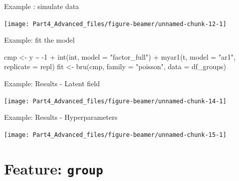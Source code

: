 \documentclass[
  ignorenonframetext,
  handout]{beamer}
\newenvironment{Shaded}{\begin{snugshade}}{\end{snugshade}}
\newcommand{\AttributeTok}[1]{\textcolor[rgb]{0.77,0.63,0.00}{#1}}
\newcommand{\DecValTok}[1]{\textcolor[rgb]{0.00,0.00,0.81}{#1}}
\newcommand{\FunctionTok}[1]{\textcolor[rgb]{0.00,0.00,0.00}{#1}}
\newcommand{\NormalTok}[1]{#1}
\newcommand{\OtherTok}[1]{\textcolor[rgb]{0.56,0.35,0.01}{#1}}
\newcommand{\SpecialCharTok}[1]{\textcolor[rgb]{0.00,0.00,0.00}{#1}}
\newcommand{\StringTok}[1]{\textcolor[rgb]{0.31,0.60,0.02}{#1}}
\begin{document}
\begin{frame}{Example : simulate data}
\protect\hypertarget{example-simulate-data-1}{}
\begin{center}\texttt{[image: Part4\_Advanced\_files/figure-beamer/unnamed-chunk-12-1]} \end{center}
\normalsize
\end{frame}

\begin{frame}[fragile]{Example: fit the model}
\protect\hypertarget{example-fit-the-model}{}
\begin{Shaded}
\begin{Highlighting}[]
\NormalTok{cmp }\OtherTok{\textless{}{-}}\NormalTok{ y }\SpecialCharTok{\textasciitilde{}}  \SpecialCharTok{{-}}\DecValTok{1} \SpecialCharTok{+} \FunctionTok{int}\NormalTok{(int,  }\AttributeTok{model =} \StringTok{"factor\_full"}\NormalTok{) }\SpecialCharTok{+}
  \FunctionTok{myar1}\NormalTok{(t, }\AttributeTok{model =} \StringTok{"ar1"}\NormalTok{, }\AttributeTok{replicate =}\NormalTok{ repl)}
\NormalTok{fit }\OtherTok{\textless{}{-}} \FunctionTok{bru}\NormalTok{(cmp, }\AttributeTok{family =} \StringTok{"poisson"}\NormalTok{, }\AttributeTok{data =}\NormalTok{ df\_groups)}
\end{Highlighting}
\end{Shaded}
\end{frame}

\begin{frame}{Example: Results - Latent field}
\protect\hypertarget{example-results---latent-field}{}
\begin{center}\texttt{[image: Part4\_Advanced\_files/figure-beamer/unnamed-chunk-14-1]} \end{center}
\end{frame}

\begin{frame}{Example: Results - Hyperparameters}
\protect\hypertarget{example-results---hyperparameters}{}
\begin{center}\texttt{[image: Part4\_Advanced\_files/figure-beamer/unnamed-chunk-15-1]} \end{center}
\end{frame}

\hypertarget{feature-group}{%
\section{\texorpdfstring{Feature:
\texttt{group}}{Feature: group}}\label{feature-group}}
\end{document}
